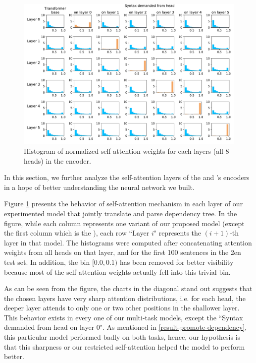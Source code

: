 \begin{figure}[t]
	\includegraphics[width=\textwidth]{img/att_dist}
    \caption{Histogram of normalized self-attention weights for each layers (all 8 heads) in the encoder.}
    \label{fig:att_dist}
\end{figure}

In this section, we further analyze the self-attention layers of the \DepParse and \DiagonalParse's encoders in a hope of better understanding the neural network we built.

Figure \ref{fig:att_dist} presents the behavior of self-attention mechanism in each layer of our experimented model that jointly translate and parse dependency tree.
In the figure, while each column represents one variant of our proposed model (except the first column which is the \transformerbase), each row ``Layer $i$" represents the $(i+1)$-th layer in that model.
The histograms were computed after concatenating attention weights from all heads on that layer, and for the first 100 sentences in the \cs2en test set.
In addition, the bin $[0.0,0.1)$ has been removed for better visibility because most of the self-attention weights actually fell into this trivial bin.

As can be seen from the figure, the charts in the diagonal stand out suggests that the chosen layers have very sharp attention distributions, i.e. for each head, the deeper layer attends to only one or two other positions in the shallower layer.
This behavior exists in every one of our multi-task models, except the ``Syntax demanded from head on layer 0".
As mentioned in \cref{result-promote-dependency}, this particular model performed badly on both tasks, hence, our hypothesis is that this sharpness or our restricted self-attention helped the model to perform better.

